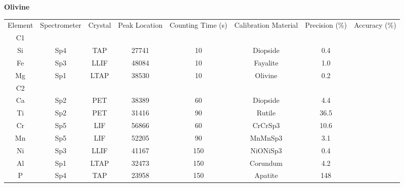 \begin{table}[!htbp]
\begin{subtable}[h]{1\textwidth}
\centering
\small \textbf{Olivine} \\ 
\vspace{5pt}
\begin{adjustbox}{width=1\textwidth, center=\textwidth}
\begin{tabular}{c c c c c c c c}
\hline 
\multirow{3}{*}{Element} & \multirow{3}{*}{Spectrometer} & \multirow{3}{*}{Crystal} & \multirow{3}{*}{Peak Location} & \multirow{3}{2cm}{\centering Counting Time (s)}  & \multirow{3}{2cm}{\centering Calibration Material} & \multirow{3}{*}{Precision (\%)} & \multirow{3}{*}{Accuracy (\%)}\\ 
\\ 
\\
\hline
C1 &  &  &  &  &  & & \\
Si & Sp4 & TAP & 27741 & 10 & Diopside & 0.4&  \\
Fe & Sp3 & LLIF & 48084 & 10 & Fayalite & 1.0 &  \\
Mg & Sp1 & LTAP & 38530 & 10 & Olivine & 0.2 &  \\
C2 &  &  &  &  &  & & \\
Ca & Sp2 & PET & 38389 & 60 & Diopside & 4.4 &  \\
Ti & Sp2 & PET & 31416 & 90 & Rutile & 36.5 &  \\
Cr & Sp5 & LIF & 56866 & 60 & CrCrSp3 & 10.6 &  \\
Mn & Sp5 & LIF & 52205 & 90 & MnMnSp3 & 3.1 &  \\
Ni & Sp3 & LLIF & 41167 & 150 & NiONiSp3 & 0.4 &  \\
Al & Sp1 & LTAP & 32473 & 150 & Corundum & 4.2 &  \\
P & Sp4 & TAP & 23958 & 150 & Apatite & 148 &  \\
\hline 
\end{tabular}
\end{adjustbox}
\vspace{3pt} \\
\end{subtable}


\end{table}
